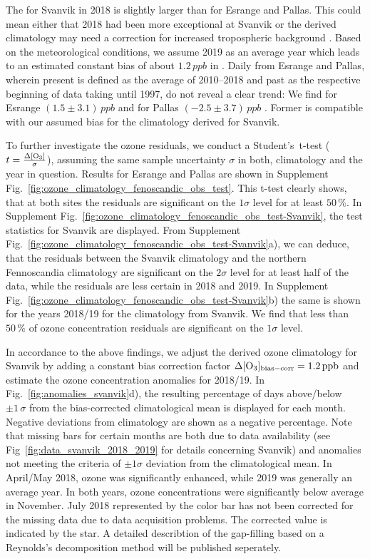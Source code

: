 \documentclass[bg, manuscript]{copernicus}
\begin{document}
The \chem{\left<\Delta\left<[O_3]\right>\right>} for Svanvik in 2018 is slightly larger than for Esrange and Pallas. This could mean either that 2018 had been more exceptional at Svanvik or the derived climatology may need a correction for increased tropospheric background \chem{[O_3]}. Based on the meteorological conditions, we assume 2019 as an average year which leads to an estimated constant bias of about $1.2\,\unit{ppb}$ in \chem{[O_3]}. Daily  from Esrange and Pallas, wherein present is defined as the average of 2010--2018 and past as the respective beginning of data taking until 1997, do not reveal a clear trend: We find for Esrange $(1.5\pm 3.1)\,\unit{ppb}$ and for Pallas $(-2.5\pm 3.7)\,\unit{ppb}$ \citep{NILU2003, BER:Ruoho-Airola2015}. Former is compatible with our assumed bias for the climatology derived for Svanvik.

To further investigate the ozone residuals, we conduct a Student's~t-test ($t = \frac{\chem{\Delta[O_3]}}{\sigma}$), assuming the same sample uncertainty $\sigma$ in both, climatology and the year in question. Results for Esrange and Pallas are shown in Supplement Fig.~\ref{fig:ozone_climatology_fenoscandic_obs_test}. This t-test clearly shows, that at both sites the residuals are significant on the $1\sigma$ level for at least $50\,\unit{\%}$. In Supplement Fig.~\ref{fig:ozone_climatology_fenoscandic_obs_test-Svanvik}, the test statistics for Svanvik are displayed. From Supplement Fig.~\ref{fig:ozone_climatology_fenoscandic_obs_test-Svanvik}a), we can deduce, that the residuals between the Svanvik climatology and the northern Fennoscandia climatology are significant on the $2\sigma$ level for at least half of the data, while the residuals are less certain in 2018 and 2019. In Supplement Fig.~\ref{fig:ozone_climatology_fenoscandic_obs_test-Svanvik}b) the same is shown for the years 2018/19 for the climatology from Svanvik. We find that less than $50\,\unit{\%}$ of ozone concentration residuals are significant on the $1\sigma$ level.

In accordance to the above findings, we adjust the derived ozone climatology for Svanvik by adding a constant bias correction factor $\Delta\chem{[O_3]_\mathrm{bias-corr}} = 1.2\,\unit{ppb}$ and estimate the ozone concentration anomalies for 2018/19. In Fig.~\ref{fig:anomalies_svanvik}d), the resulting percentage of days above/below $\pm 1\,\sigma$ from the bias-corrected climatological mean is displayed for each month. Negative deviations from climatology are shown as a negative percentage. Note that missing bars for certain months are both due to data availability (see Fig~\ref{fig:data_svanvik_2018_2019} for details concerning Svanvik) and anomalies not meeting the criteria of $\pm 1\sigma$ deviation from the climatological mean. In April/May 2018, ozone was significantly enhanced, while 2019 was generally an average year. In both years, ozone concentrations were significantly below average in November. July 2018 represented by the color bar has not been corrected for the missing data due to data acquisition problems. The corrected value is indicated by the star. A detailed describtion of the gap-filling based on a Reynolds's decomposition method will be published seperately.
\end{document}
